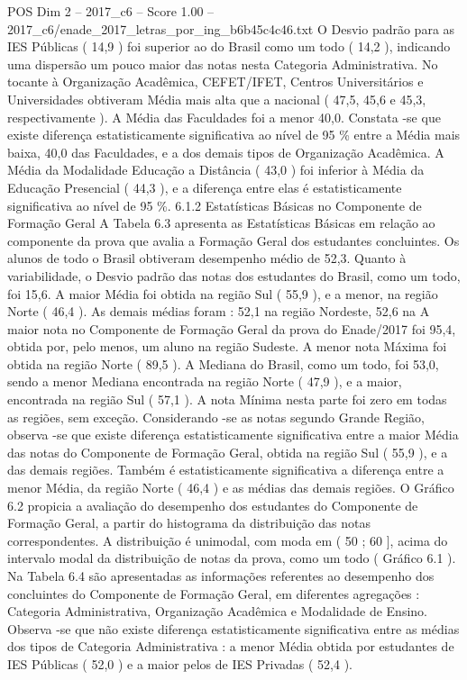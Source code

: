 \begin{textsample}{POS Dim 2 – 2017\_c6 – Score 1.00 – 2017\_c6/enade\_2017\_letras\_por\_ing\_b6b45c4c46.txt}
O Desvio padrão para as IES Públicas ( 14,9 ) foi superior ao do Brasil como um todo ( 14,2 ), indicando uma dispersão um pouco maior das notas nesta Categoria Administrativa.
No tocante à Organização Acadêmica, CEFET/IFET, Centros Universitários e Universidades obtiveram Média mais alta que a nacional ( 47,5, 45,6 e 45,3, respectivamente ).
A Média das Faculdades foi a menor 40,0.
Constata -se que existe diferença estatisticamente significativa ao nível de 95 \% entre a Média mais baixa, 40,0 das Faculdades, e a dos demais tipos de Organização Acadêmica.
A Média da Modalidade Educação a Distância ( 43,0 ) foi inferior à Média da Educação Presencial ( 44,3 ), e a diferença entre elas é estatisticamente significativa ao nível de 95 \%. 6.1.2 Estatísticas Básicas no Componente de Formação Geral A Tabela 6.3 apresenta as Estatísticas Básicas em relação ao componente da prova que avalia a Formação Geral dos estudantes concluintes.
Os alunos de todo o Brasil obtiveram desempenho médio de 52,3.
Quanto à variabilidade, o Desvio padrão das notas dos estudantes do Brasil, como um todo, foi 15,6.
A maior Média foi obtida na região Sul ( 55,9 ), e a menor, na região Norte ( 46,4 ).
As demais médias foram : 52,1 na região Nordeste, 52,6 na A maior nota no Componente de Formação Geral da prova do Enade/2017 foi 95,4, obtida por, pelo menos, um aluno na região Sudeste.
A menor nota Máxima foi obtida na região Norte ( 89,5 ).
A Mediana do Brasil, como um todo, foi 53,0, sendo a menor Mediana encontrada na região Norte ( 47,9 ), e a maior, encontrada na região Sul ( 57,1 ).
A nota Mínima nesta parte foi zero em todas as regiões, sem exceção.
Considerando -se as notas segundo Grande Região, observa -se que existe diferença estatisticamente significativa entre a maior Média das notas do Componente de Formação Geral, obtida na região Sul ( 55,9 ), e a das demais regiões.
Também é estatisticamente significativa a diferença entre a menor Média, da região Norte ( 46,4 ) e as médias das demais regiões.
O Gráfico 6.2 propicia a avaliação do desempenho dos estudantes do Componente de Formação Geral, a partir do histograma da distribuição das notas correspondentes.
A distribuição é unimodal, com moda em ( 50 ; 60 ], acima do intervalo modal da distribuição de notas da prova, como um todo ( Gráfico 6.1 ).
Na Tabela 6.4 são apresentadas as informações referentes ao desempenho dos concluintes do Componente de Formação Geral, em diferentes agregações : Categoria Administrativa, Organização Acadêmica e Modalidade de Ensino.
Observa -se que não existe diferença estatisticamente significativa entre as médias dos tipos de Categoria Administrativa : a menor Média obtida por estudantes de IES Públicas ( 52,0 ) e a maior pelos de IES Privadas ( 52,4 ).

\end{textsample}
